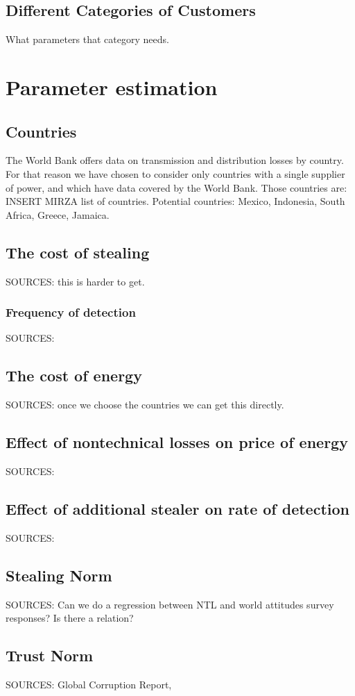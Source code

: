 \documentclass{article}
\begin{document}
\subsection{Different Categories of Customers}
What parameters that category needs. 

\section{Parameter estimation}

\subsection{Countries}
The World Bank offers data on transmission and distribution losses by country. For that reason we have chosen to consider only countries with a single supplier of power, and which have data covered by the World Bank. Those countries are: INSERT MIRZA list of countries. Potential countries: Mexico, Indonesia, South Africa, Greece, Jamaica. 


\subsection{The cost of stealing}
SOURCES:  this is harder to get. 
\subsubsection{Frequency of detection}
SOURCES: 
\subsection{The cost of energy}
SOURCES: once we choose the countries we can get this directly. 
\subsection{Effect of nontechnical losses on price of energy}
SOURCES:
\subsection{Effect of additional stealer on rate of detection}
SOURCES:
\subsection{Stealing Norm}
SOURCES: Can we do a regression between NTL and world attitudes survey responses? Is there a relation? 
\subsection{Trust Norm}
SOURCES:  Global Corruption Report, 
\end{document}
